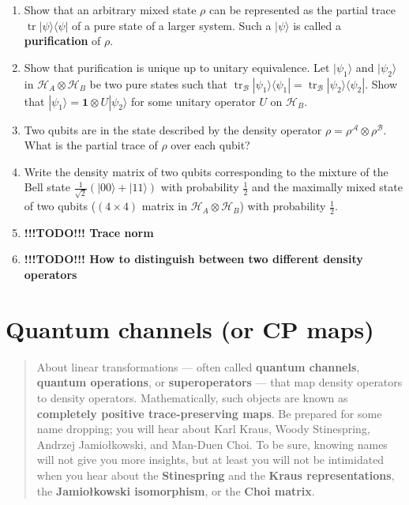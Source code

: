 \documentclass[fleqn]{article}
\let\oldsection\section
\renewcommand\section{\clearpage\oldsection}
\begin{document}
\begin{enumerate}
\def\labelenumi{\arabic{enumi}.}
\item
  Show that an arbitrary mixed state \(\rho\) can be represented as the partial trace \(\operatorname{tr}|\psi\rangle\langle\psi|\) of a pure state of a larger system.
  Such a \(|\psi\rangle\) is called a \textbf{purification} of \(\rho\).
\item
  Show that purification is unique up to unitary equivalence.
  Let \(|\psi_1\rangle\) and \(|\psi_2\rangle\) in \(\mathcal{H}_A\otimes\mathcal{H}_B\) be two pure states such that \(\operatorname{tr}_{\mathcal{B}}|\psi_1\rangle\langle\psi_1| = \operatorname{tr}_{\mathcal{B}}|\psi_2\rangle\langle\psi_2|\).
  Show that \(|\psi_1\rangle = \mathbf{1}\otimes U|\psi_2\rangle\) for some unitary operator \(U\) on \(\mathcal{H}_B\).
\item
  Two qubits are in the state described by the density operator \(\rho = \rho^\mathcal{A}\otimes\rho^\mathcal{B}\).
  What is the partial trace of \(\rho\) over each qubit?
\item
  Write the density matrix of two qubits corresponding to the mixture of the Bell state \(\frac{1}{\sqrt 2}\left(|00\rangle + |11\rangle\right)\) with probability \(\frac12\) and the maximally mixed state of two qubits (\((4\times 4)\) matrix in \(\mathcal{H}_A\otimes\mathcal{H}_B\)) with probability \(\frac12\).
\item
  \textbf{!!!TODO!!! Trace norm}
\item
  \textbf{!!!TODO!!! How to distinguish between two different density operators}
\end{enumerate}

\hypertarget{chapter10}{%
\section{Quantum channels (or CP maps)}\label{chapter10}}

\begin{quote}
About linear transformations --- often called \textbf{quantum channels}, \textbf{quantum operations}, or \textbf{superoperators} --- that map density operators to density operators. Mathematically, such objects are known as \textbf{completely positive trace-preserving maps}. Be prepared for some name dropping; you will hear about Karl Kraus, Woody Stinespring, Andrzej Jamiołkowski, and Man-Duen Choi. To be sure, knowing names will not give you more insights, but at least you will not be intimidated when you hear about the \textbf{Stinespring} and the \textbf{Kraus representations}, the \textbf{Jamiołkowski isomorphism}, or the \textbf{Choi matrix}.
\end{quote}
\end{document}
